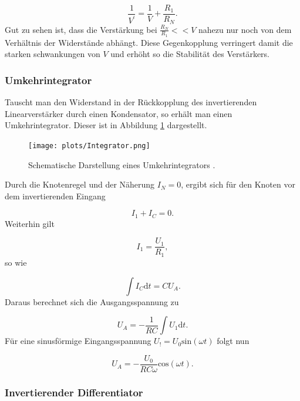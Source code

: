 \begin{equation}
    \frac{1}{V^{'}} = \frac{1}{V} + \frac{R_1}{R_N}.
\end{equation}
Gut zu sehen ist, dass die Verstärkung bei $\frac{R_N}{R_1} << V$ nahezu nur noch von dem Verhältnis der Widerstände abhängt.
Diese Gegenkopplung verringert damit die starken schwankungen von $V$ und erhöht so die Stabilität des Verstärkers.



\subsubsection{Umkehrintegrator}
\label{sec:Umkehrintegrator}

Tauscht man den Widerstand in der Rückkopplung des invertierenden Linearverstärker durch einen Kondensator, so erhält man einen Umkehrintegrator.
Dieser ist in Abbildung \ref{fig:3} dargestellt.

\begin{figure}
    \centering
        \texttt{[image: plots/Integrator.png]}
    \caption{Schematische Darstellung eines Umkehrintegrators \cite{Anleitung}.}
    \label{fig:3}
\end{figure}

Durch die Knotenregel und der Näherung $I_N = 0$, ergibt sich für den Knoten vor dem invertierenden Eingang

\begin{equation}
    I_1 + I_C = 0.
\end{equation}
Weiterhin gilt

\begin{equation}
    I_1 = \frac{U_1}{R_1},
\end{equation}
so wie

\begin{equation}
    \int I_C \text{d}t = C U_A.
\end{equation}
Daraus berechnet sich die Ausgangsspannung zu 

\begin{equation}
    U_A = -\frac{1}{R C} \int U_1 \text{d}t.
\end{equation}
Für eine sinusförmige Eingangsspannung $U_! = U_0 \text{sin}(\omega t)$ folgt nun

\begin{equation}
    U_A = - \frac{U_0}{R C \omega} \text{cos}(\omega t).
\end{equation}



\subsubsection{Invertierender Differentiator}
\label{sec:Invertierter_Differentiator}

